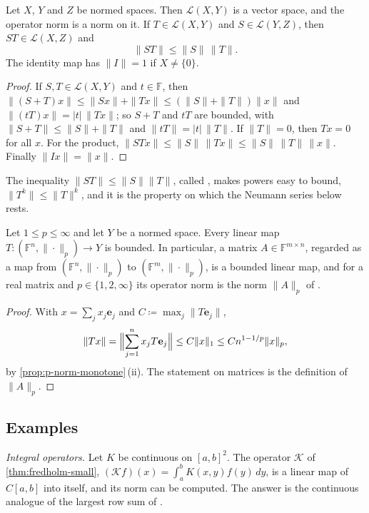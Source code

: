 \begin{proposition}
\label{prop:operator-norm}
Let $X$, $Y$ and $Z$ be normed spaces. Then $\mathcal L(X,Y)$ is a vector space, and the operator norm is a norm on it. If $T\in\mathcal L(X,Y)$ and $S\in\mathcal L(Y,Z)$, then $ST\in\mathcal L(X,Z)$ and
\[
\|ST\|\le\|S\|\,\|T\| .
\]
The identity map has $\|I\|=1$ if $X\ne\{0\}$.
\end{proposition}

\begin{proof}
If $S,T\in\mathcal L(X,Y)$ and $t\in\mathbb F$, then $\|(S+T)x\|\le\|Sx\|+\|Tx\|\le(\|S\|+\|T\|)\|x\|$ and $\|(tT)x\|=|t|\,\|Tx\|$; so $S+T$ and $tT$ are bounded, with $\|S+T\|\le\|S\|+\|T\|$ and $\|tT\|=|t|\,\|T\|$. If $\|T\|=0$, then $Tx=0$ for all $x$. For the product, $\|STx\|\le\|S\|\,\|Tx\|\le\|S\|\,\|T\|\,\|x\|$. Finally $\|Ix\|=\|x\|$.
\end{proof}

The inequality $\|ST\|\le\|S\|\|T\|$, called , makes powers easy to bound, $\|T^k\|\le\|T\|^k$, and it is the property on which the Neumann series below rests.

\begin{proposition}
\label{prop:finite-dim-bounded}
Let $1\le p\le\infty$ and let $Y$ be a normed space. Every linear map $T\colon(\mathbb F^n,\|\cdot\|_p)\to Y$ is bounded. In particular, a matrix $A\in\mathbb F^{m\times n}$, regarded as a map from $(\mathbb F^n,\|\cdot\|_p)$ to $(\mathbb F^m,\|\cdot\|_p)$, is a bounded linear map, and for a real matrix and $p\in\{1,2,\infty\}$ its operator norm is the norm $\|A\|_p$ of .
\end{proposition}

\begin{proof}
With $x=\sum_jx_j\mathbf e_j$ and $C\coloneqq\max_j\|T\mathbf e_j\|$,
\[
\|Tx\|=\Bigl\|\sum_{j=1}^nx_jT\mathbf e_j\Bigr\|\le C\|x\|_1\le Cn^{1-1/p}\|x\|_p ,
\]
by \cref{prop:p-norm-monotone}\,(ii). The statement on matrices is the definition of $\|A\|_p$.
\end{proof}

\subsection{Examples}

\emph{Integral operators.} Let $K$ be continuous on $[a,b]^2$. The operator $\mathcal K$ of \cref{thm:fredholm-small}, $(\mathcal Kf)(x)=\int_a^bK(x,y)f(y)\,dy$, is a linear map of $C[a,b]$ into itself, and its norm can be computed. The answer is the continuous analogue of the largest row sum of .

